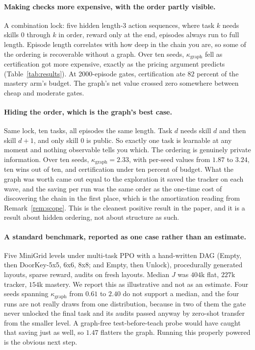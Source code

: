 \documentclass[11pt]{article}
\theoremstyle{plain}
\theoremstyle{definition}
\theoremstyle{remark}
\begin{document}
\paragraph{Making checks more expensive, with the order partly visible.} A combination lock: five
hidden length-3 action sequences, where task $k$ needs skills $0$ through $k$ in order, reward only
at the end, episodes always run to full length. Episode length correlates with how deep in the chain
you are, so some of the ordering is recoverable without a graph. Over ten seeds,
$\kappa_{\mathrm{graph}}$ fell as certification got more expensive, exactly as the pricing argument
predicts (Table~\ref{tab:results}). At 2000-episode gates, certification ate $82$ percent of the
mastery arm's budget. The graph's net value crossed zero somewhere between cheap and moderate gates.

\paragraph{Hiding the order, which is the graph's best case.} Same lock, ten tasks, all episodes the
same length. Task $d$ needs skill $d$ and then skill $d+1$, and only skill $0$ is public. So exactly
one task is learnable at any moment and nothing observable tells you which. The ordering is
genuinely private information. Over ten seeds, $\kappa_{\mathrm{graph}}=2.33$, with per-seed values
from $1.87$ to $3.24$, ten wins out of ten, and certification under ten percent of budget. What the
graph was worth came out equal to the exploration it saved the tracker on each wave, and the saving
per run was the same order as the one-time cost of discovering the chain in the first place, which is
the amortization reading from Remark~\ref{rem:scope}. This is the cleanest positive result in the
paper, and it is a result about hidden ordering, not about structure as such.

\paragraph{A standard benchmark, reported as one case rather than an estimate.} Five MiniGrid levels
under multi-task PPO with a hand-written DAG (Empty, then DoorKey-5x5, 6x6, 8x8; and Empty, then
Unlock), procedurally generated layouts, sparse reward, audits on fresh layouts. Median $J$ was
$404$k flat, $227$k tracker, $154$k mastery. We report this as illustrative and not as an estimate.
Four seeds spanning $\kappa_{\mathrm{graph}}$ from $0.61$ to $2.40$ do not support a median, and the
four runs are not really draws from one distribution, because in two of them the gate never unlocked
the final task and its audits passed anyway by zero-shot transfer from the smaller level. A
graph-free test-before-teach probe would have caught that saving just as well, so $1.47$ flatters
the graph. Running this properly powered is the obvious next step.
\end{document}
